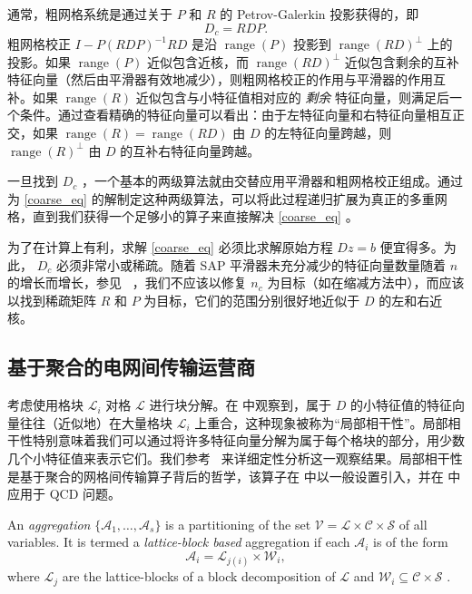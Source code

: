 \documentclass{siamltex}
\newcommand{\range}{\mathop{\mathrm{range}}\nolimits}
\begin{document}
通常，粗网格系统是通过关于    $P$    和    $R$    的 Petrov-Galerkin 投影获得的，即
\[
  D_c = RDP.
\]    粗网格校正    $I-P(RDP)^{-1}RD$    是沿    $\range(P)$    投影到    $\range(RD)^\perp$    上的投影。如果    $\range(P)$    近似包含近核，而    $\range(RD)^\perp$    近似包含剩余的互补特征向量（然后由平滑器有效地减少），则粗网格校正的作用与平滑器的作用互补。如果    $\range(R)$    近似包含与小特征值相对应的  {    \em    剩余   }  特征向量，则满足后一个条件。通过查看精确的特征向量可以看出：由于左特征向量和右特征向量相互正交，如果    $\range(R)= \range(RD)$    由    $D$    的左特征向量跨越，则    $\range(R)^\perp$    由    $D$    的互补右特征向量跨越。

一旦找到    $D_c$   ，一个基本的两级算法就由交替应用平滑器和粗网格校正组成。通过为    \eqref{coarse_eq}    的解制定这种两级算法，可以将此过程递归扩展为真正的多重网格，直到我们获得一个足够小的算子来直接解决    \eqref{coarse_eq}   。

为了在计算上有利，求解    \eqref{coarse_eq}    必须比求解原始方程    $Dz = b$    便宜得多。为此，   $D_c$    必须非常小或稀疏。随着 SAP 平滑器未充分减少的特征向量数量随着    $n$    的增长而增长，参见~    \cite{Banks:1979yr}    ，我们不应该以修复    $n_c$    为目标（如在缩减方法中），而应该以找到稀疏矩阵    $R$    和    $P$    为目标，它们的范围分别很好地近似于    $D$    的左和右近核。
\subsection{基于聚合的电网间传输运营商  }       \label{sec:aggAMG}    考虑使用格块    $\mathcal{L}_i$    对格    $\mathcal{L}$    进行块分解。在    \cite{Luescher2007}    中观察到，属于    $D$    的小特征值的特征向量往往（近似地）在大量格块    $\mathcal{L}_i$    上重合，这种现象被称为“局部相干性”。局部相干性特别意味着我们可以通过将许多特征向量分解为属于每个格块的部分，用少数几个小特征值来表示它们。我们参考~    \cite{Luescher2007}    来详细定性分析这一观察结果。局部相干性是基于聚合的网格间传输算子背后的哲学，该算子在    \cite{DBraess_1995, Brezina2005}    中以一般设置引入，并在
\cite{MGClark2010_1,MGClark2007,MGClark2010_2}    中应用于 QCD 问题。

\begin{definition} An {\em aggregation}         $ \{ \mathcal{A}_1,\ldots,\mathcal{A}_s \} $         is a partitioning of the set         $\mathcal{V} = \mathcal{L}\times\mathcal{C}\times\mathcal{S}$         of all variables. It is termed a {\em lattice-block based} aggregation if each         $\mathcal{A}_i$         is of the form
  \[
    \mathcal{A}_i = \mathcal{L}_{j(i)} \times \mathcal{W}_{i},
  \]
  where         $\mathcal{L}_j$         are the lattice-blocks of a block decomposition of         $\mathcal{L}$         and         $\mathcal{W}_i \subseteq \mathcal{C} \times \mathcal{S}$        .
\end{definition}
\end{document}
